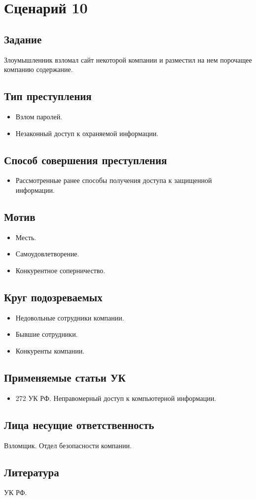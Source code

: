 \section*{Сценарий 10}

\subsection*{Задание}
Злоумышленник взломал сайт некоторой компании и разместил на нем порочащее
компанию содержание.

\subsection*{Тип преступления}
\begin{itemize}
  \item Взлом паролей.
  \item Незаконный доступ к охраняемой информации.
\end{itemize}

\subsection*{Способ совершения преступления}
\begin{itemize}
  \item Рассмотренные ранее способы получения доступа к защищенной информации.
\end{itemize}

\subsection*{Мотив}
\begin{itemize}
  \item Месть.
  \item Самоудовлетворение.
  \item Конкурентное соперничество.
\end{itemize}

\subsection*{Круг подозреваемых}
\begin{itemize}
  \item Недовольные сотрудники компании.
  \item Бывшие сотрудники.
  \item Конкуренты компании.
\end{itemize}

\subsection*{Применяемые статьи УК}
\begin{itemize}
  \item 272 УК РФ. Неправомерный доступ к компьютерной информации.
\end{itemize}

\subsection*{Лица несущие ответственность}
Взломщик. Отдел безопасности компании.

\subsection*{Литература} УК РФ.
